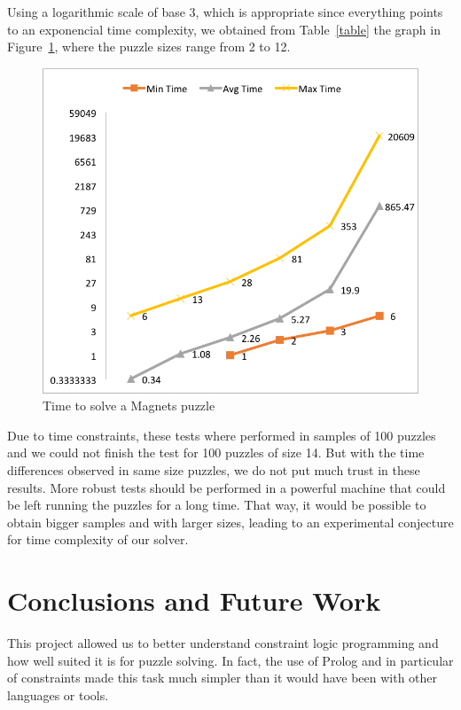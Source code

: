 \documentclass{llncs}
\begin{document}
Using a logarithmic scale of base 3, which is appropriate since everything points to an exponencial time complexity, we obtained from Table~\ref{table} the graph in Figure~\ref{chart}, where the puzzle sizes range from 2 to 12.

\begin{figure}[htbp]
\begin{center}
\includegraphics[scale=0.7]{chart.png}
\caption{Time to solve a Magnets puzzle}
\label{chart}
\end{center}
\end{figure}

Due to time constraints, these tests where performed in samples of 100 puzzles and we could not finish the test for 100 puzzles of size 14. But with the time differences observed in same size puzzles, we do not put much trust in these results. More robust tests should be performed in a powerful machine that could be left running the puzzles for a long time. That way, it would be possible to obtain bigger samples and with larger sizes, leading to an experimental conjecture for time complexity of our solver.


\section{Conclusions and Future Work} 

This project allowed us to better understand constraint logic programming and how well suited it is for puzzle solving. In fact, 
the use of Prolog and in particular of constraints made this task much simpler than it would have been with other languages or tools.
\end{document}
